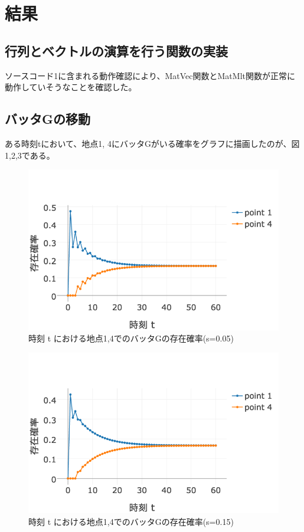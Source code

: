 \documentclass[11pt]{ltjsarticle}
\begin{document}
\section{結果}
\subsection{行列とベクトルの演算を行う関数の実装}
	ソースコード1に含まれる動作確認により、MatVec関数とMatMlt関数が正常に動作していそうなことを確認した。

\subsection{バッタGの移動}
	ある時刻tにおいて、地点1, 4にバッタGがいる確率をグラフに描画したのが、図1,2,3である。

	\begin{figure}
  		\includegraphics[width=\textwidth]{fig1.png}
  		\caption{時刻 t における地点1,4でのバッタGの存在確率(s=0.05)}
	\end{figure}

	\begin{figure}
  		\includegraphics[width=\textwidth]{fig2.png}
  		\caption{時刻 t における地点1,4でのバッタGの存在確率(s=0.15)}
	\end{figure}
\end{document}
